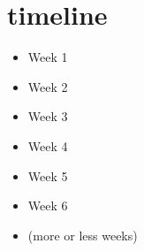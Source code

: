 \section{timeline}

\begin{itemize}
    \item{Week 1}
    \item{Week 2}
    \item{Week 3}
    \item{Week 4}
    \item{Week 5}
    \item{Week 6}
    \item{(more or less weeks)}
\end{itemize}
